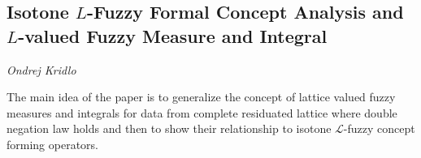 \documentclass[../booklet.tex]{subfiles}
\begin{document}
\subsection[Isotone $L$-Fuzzy Formal Concept Analysis and $L$-valued Fuzzy Measure and Integral. {\it Ondrej Kridlo}]{Isotone $L$-Fuzzy Formal Concept Analysis and $L$-valued Fuzzy Measure and Integral}

\begin{center}
  {\it Ondrej Kridlo}
\end{center}

\vskip 0.8cm

\newcommand{\LL}{{\mathcal L}}

The main idea of the paper is to generalize the concept of lattice valued fuzzy measures and integrals for data from complete residuated lattice where double negation law holds and then to show their relationship to isotone $\LL$-fuzzy concept forming operators.
\end{document}
